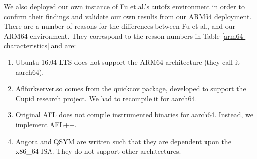 We also deployed our own instance of Fu et.al.\cite{Fu}'s autofz environment
in order to confirm their findings and validate our own results from our ARM64
deployment. There are a number of reasons for the differences between Fu et al., 
and our ARM64 environment. They correspond to the reason numbers in Table \ref{arm64-characteristics}
and are:
\begin{enumerate}
    \item Ubuntu 16.04 LTS does not support the ARM64 architecture (they call it aarch64).
    \item Aflforkserver.so comes from the quickcov package, developed to support the Cupid
    research project\cite{guler2020cupid}. We had to recompile it for aarch64.
    \item Original AFL does not compile instrumented binaries for aarch64. Instead, we
    implement AFL++.
    \item Angora and QSYM are written such that they are dependent upon the x86\_64 ISA.
    They do not support other architectures.
\end{enumerate}
    





